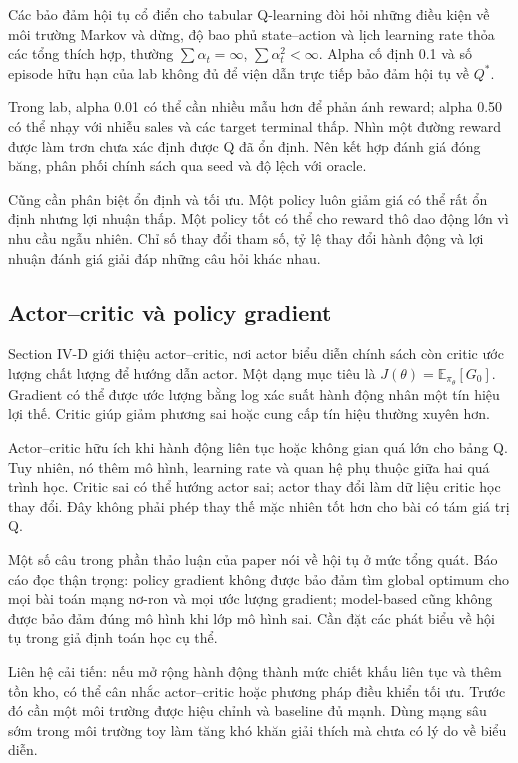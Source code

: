 Các bảo đảm hội tụ cổ điển cho tabular Q-learning đòi hỏi những điều
kiện về môi trường Markov và dừng, độ bao phủ state--action và lịch
learning rate thỏa các tổng thích hợp, thường \(\sum\alpha_t=\infty\),
\(\sum\alpha_t^2<\infty\). Alpha cố định 0.1 và số episode hữu hạn của
lab không đủ để viện dẫn trực tiếp bảo đảm hội tụ về \(Q^*\).
\cite{watkins}

Trong lab, alpha 0.01 có thể cần nhiều mẫu hơn để phản ánh reward; alpha
0.50 có thể nhạy với nhiễu sales và các target terminal thấp. Nhìn một
đường reward được làm trơn chưa xác định được Q đã ổn định. Nên kết hợp
đánh giá đóng băng, phân phối chính sách qua seed và độ lệch với oracle.

Cũng cần phân biệt ổn định và tối ưu. Một policy luôn giảm giá có thể
rất ổn định nhưng lợi nhuận thấp. Một policy tốt có thể cho reward thô
dao động lớn vì nhu cầu ngẫu nhiên. Chỉ số thay đổi tham số, tỷ lệ thay
đổi hành động và lợi nhuận đánh giá giải đáp những câu hỏi khác nhau.

\subsection{Actor--critic và policy
gradient}\label{actorcritic-vuxe0-policy-gradient}

Section IV-D giới thiệu actor--critic, nơi actor biểu diễn chính sách
còn critic ước lượng chất lượng để hướng dẫn actor. Một dạng mục tiêu là
\(J(\theta)=\mathbb E_{\pi_\theta}[G_0]\). Gradient có thể được ước
lượng bằng log xác suất hành động nhân một tín hiệu lợi thế. Critic giúp
giảm phương sai hoặc cung cấp tín hiệu thường xuyên hơn.

Actor--critic hữu ích khi hành động liên tục hoặc không gian quá lớn cho
bảng Q. Tuy nhiên, nó thêm mô hình, learning rate và quan hệ phụ thuộc
giữa hai quá trình học. Critic sai có thể hướng actor sai; actor thay
đổi làm dữ liệu critic học thay đổi. Đây không phải phép thay thế mặc
nhiên tốt hơn cho bài có tám giá trị Q.

Một số câu trong phần thảo luận của paper nói về hội tụ ở mức tổng quát.
Báo cáo đọc thận trọng: policy gradient không được bảo đảm tìm global
optimum cho mọi bài toán mạng nơ-ron và mọi ước lượng gradient;
model-based cũng không được bảo đảm đúng mô hình khi lớp mô hình sai.
Cần đặt các phát biểu về hội tụ trong giả định toán học cụ thể.

Liên hệ cải tiến: nếu mở rộng hành động thành mức chiết khấu liên tục và
thêm tồn kho, có thể cân nhắc actor--critic hoặc phương pháp điều khiển
tối ưu. Trước đó cần một môi trường được hiệu chỉnh và baseline đủ mạnh.
Dùng mạng sâu sớm trong môi trường toy làm tăng khó khăn giải thích mà
chưa có lý do về biểu diễn.

